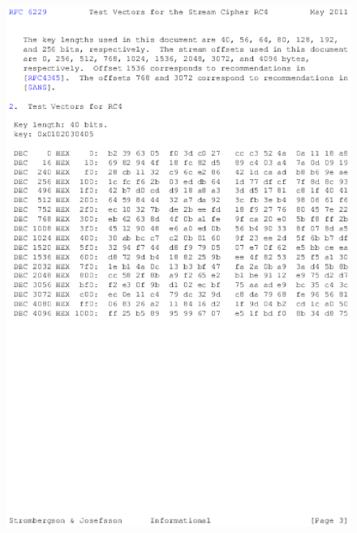 \begin{anexosenv}
\begin{figure}
\centering
\includegraphics{figuras/file-2}
\end{figure}


\end{anexosenv}
